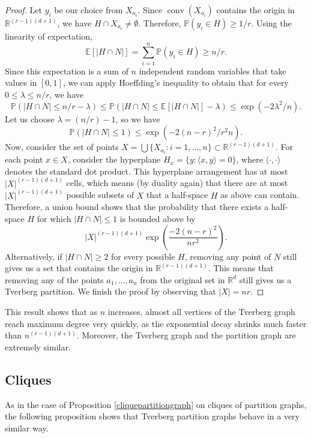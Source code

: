 \documentclass[11pt,a4paper]{article}
\theoremstyle{plain}
\theoremstyle{definition}
\newcommand{\rr}{\mathds{R}}
\newcommand{\conv}{\operatorname{conv}}
\begin{document}
\begin{proof}
    Let $y_i$ be our choice from $X_{a_i}$.  Since $\conv(X_{a_i})$ contains the origin in $\rr^{(r-1)(d+1)}$, we have $H \cap X_{a_i} \neq \emptyset$. Therefore, $\mathbb{P} (y_i \in H) \ge 1/r$.  Using the linearity of expectation, 
    \[
\mathbb{E}[|H \cap N|] = \sum_{i=1}^n \mathbb{P} (y_i \in H) \ge n/r.
    \]
    Since this expectation is a sum of $n$ independent random variables that take values in $[0,1]$, we can apply Hoeffding's inequality to obtain that for every $0\le \lambda \le n/r$, we have
    \[
    \mathbb{P}(|H \cap N| \le n/r - \lambda) \le \mathbb{P}(|H \cap N| \le \mathbb{E}[|H \cap N|] - \lambda)\le \exp(-2\lambda^2/n).
    \]
    Let us choose $\lambda = (n/r)-1$, so we have
    \[
    \mathbb{P}(|H \cap N| \le 1) \le \exp(-2(n-r)^2/r^2n).
    \]
    Now, consider the set of points $X=\bigcup\{X_{a_i} \colon i =1,\dots, n\}\subset \rr^{(r-1)(d+1)}$. For each point $x \in X$, consider the hyperplane $H_x = \{y \colon \langle x,y\rangle = 0\}$, where $\langle \cdot, \cdot \rangle$ denotes the standard dot product.  This hyperplane arrangement has at most $|X|^{(r-1)(d+1)}$ cells, which means (by duality again) that there are at most $|X|^{(r-1)(d+1)}$ possible subsets of $X$ that a half-space $H$ as above can contain.  Therefore, a union bound shows that the probability that there exists a half-space $H$ for which $|H \cap N| \le 1$ is bounded above by 
    \[
  |X|^{(r-1)(d+1)}\exp\left(\frac{-2(n-r)^2}{nr^2}\right).
    \]
    Alternatively, if $|H \cap N| \ge 2$ for every possible $H$, removing any point of $N$ still gives us a set that contains the origin in $\rr^{(r-1)(d+1)}$.  This means that removing any of the points $a_1, \dots, a_n$ from the original set in $\rr^d$ still gives us a Tverberg partition.  We finish the proof by observing that $|X| = nr$.
\end{proof}

This result shows that as $n$ increases, almost all vertices of the Tverberg graph reach maximum degree very quickly, as the exponential decay shrinks much faster than $n^{(r-1)(d+1)}$.  Moreover, the Tverberg graph and the partition graph are extremely similar.

\subsection{Cliques}

As in the case of Proposition \ref{cliquepartitiongraph} on cliques of partition graphs, the following proposition shows that Tverberg partition graphs behave in a very similar way.
\end{document}
